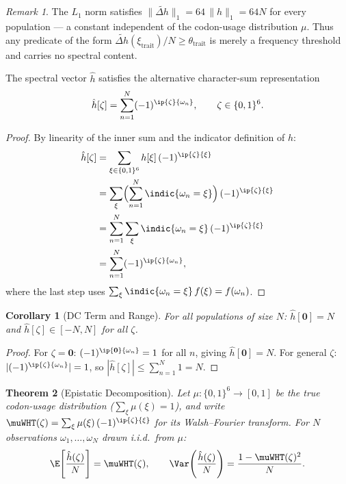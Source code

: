 \documentclass[12pt,letterpaper]{article}
\theoremstyle{definition}
\theoremstyle{plain}
\newtheorem{theorem}{Theorem}[section]
\newtheorem{corollary}[theorem]{Corollary}
\theoremstyle{remark}
\newtheorem*{remark}{Remark}
\newcommand{\hhat}{\hat{h}}
\begin{document}
\begin{remark}
The $L_1$ norm satisfies $\|\tilde{\Delta h}\|_1 = 64\,\|h\|_1 = 64N$
for every population --- a constant independent of the codon-usage
distribution $\mu$.  Thus any predicate of the form
$\tilde{\Delta h}(\xi_{\mathrm{trait}})/N \ge \theta_{\mathrm{trait}}$
is merely a frequency threshold and carries no spectral content.
\end{remark}

\begin{proposition}
\label{prop:char-function}
The spectral vector $\hhat$ satisfies the alternative character-sum
representation
\[
  \hhat[\zeta] = \sum_{n=1}^{N}(-1)^{\ip{\zeta}{\omega_n}},
  \qquad \zeta \in \{0,1\}^6.
\]
\end{proposition}

\begin{proof}
By linearity of the inner sum and the indicator definition of $h$:
\begin{align*}
  \hhat[\zeta]
    &= \sum_{\xi \in \{0,1\}^6} h[\xi]\,(-1)^{\ip{\zeta}{\xi}} \\
    &= \sum_{\xi} \Bigl(\sum_{n=1}^{N}\indic{\omega_n=\xi}\Bigr)\,(-1)^{\ip{\zeta}{\xi}} \\
    &= \sum_{n=1}^{N}\sum_{\xi}\indic{\omega_n=\xi}\,(-1)^{\ip{\zeta}{\xi}} \\
    &= \sum_{n=1}^{N}(-1)^{\ip{\zeta}{\omega_n}},
\end{align*}
where the last step uses $\sum_{\xi}\indic{\omega_n=\xi}\,f(\xi) = f(\omega_n)$.
\end{proof}

\begin{corollary}[DC Term and Range]
\label{cor:dc-range}
For all populations of size $N$: $\hhat[\mathbf{0}] = N$ and
$\hhat[\zeta] \in [-N, N]$ for all $\zeta$.
\end{corollary}

\begin{proof}
For $\zeta = \mathbf{0}$: $(-1)^{\ip{\mathbf{0}}{\omega_n}} = 1$ for all $n$,
giving $\hhat[\mathbf{0}] = N$.
For general $\zeta$: $|(-1)^{\ip{\zeta}{\omega_n}}| = 1$, so
$|\hhat[\zeta]| \le \sum_{n=1}^N 1 = N$.
\end{proof}

\begin{theorem}[Epistatic Decomposition]
\label{thm:epistatic}
Let $\mu : \{0,1\}^6 \to [0,1]$ be the true codon-usage distribution
($\sum_\xi \mu(\xi) = 1$), and write
$\muWHT(\zeta) = \sum_\xi \mu(\xi)\,(-1)^{\ip{\zeta}{\xi}}$ for its
Walsh--Fourier transform.  For $N$ observations $\omega_1,\ldots,\omega_N$
drawn i.i.d.\ from $\mu$:
\[
  \E\!\left[\frac{\hhat(\zeta)}{N}\right] = \muWHT(\zeta), \qquad
  \Var\!\left(\frac{\hhat(\zeta)}{N}\right)
    = \frac{1 - \muWHT(\zeta)^2}{N}.
\]
\end{theorem}
\end{document}
